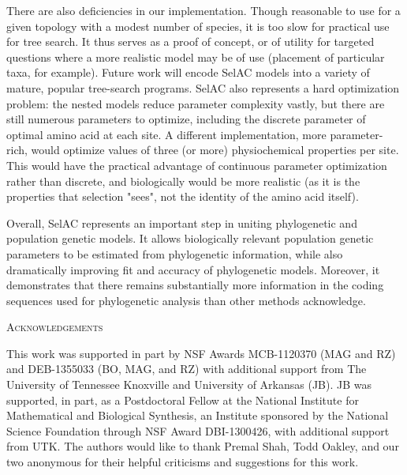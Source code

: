 \documentclass[12pt,letterpaper]{article}
\renewcommand{\section}[1]{%
\bigskip
\begin{center}
\begin{Large}
\normalfont\scshape #1
\medskip
\end{Large}
\end{center}}
\newcommand{\selac}{SelAC\xspace}
\begin{document}
There are also deficiencies in our implementation.
Though reasonable to use for a given topology with a modest number of species, it is too slow for practical use for tree search.
It thus serves as a proof of concept, or of utility for targeted questions where a more realistic model may be of use (placement of particular taxa, for example).
Future work will encode \selac models into a variety of mature, popular tree-search programs.
\selac also represents a hard optimization problem: the nested models reduce parameter complexity vastly, but there are still numerous parameters to optimize, including the discrete parameter of optimal amino acid at each site.
A different implementation, more parameter-rich, would optimize values of three (or more) physiochemical properties per site.
This would have the practical advantage of continuous parameter optimization rather than discrete, and biologically would be more realistic (as it is the properties that selection "sees", not the identity of the amino acid itself).

Overall, \selac represents an important step in uniting phylogenetic and population genetic models.
It allows biologically relevant population genetic parameters to be estimated from phylogenetic information, while also dramatically improving fit and accuracy of phylogenetic models.
Moreover, it demonstrates that there remains substantially more information in the coding sequences used for phylogenetic analysis than other methods acknowledge.

\section{Acknowledgements}
This work was supported in part by NSF Awards MCB-1120370 (MAG and RZ) and DEB-1355033 (BO, MAG, and RZ) with additional support from The University of Tennessee Knoxville and University of Arkansas (JB).
JB was supported, in part, as a Postdoctoral Fellow at the National Institute for Mathematical and Biological Synthesis, an Institute sponsored by the National Science Foundation through NSF Award DBI-1300426, with additional support from UTK.
The authors would like to thank Premal Shah, Todd Oakley, and our two anonymous  for their helpful criticisms and suggestions for this work.
\clearpage



%
\renewcommand\refname{\begin{center}{\normalfont\scshape References}\end{center}}

\end{document}
